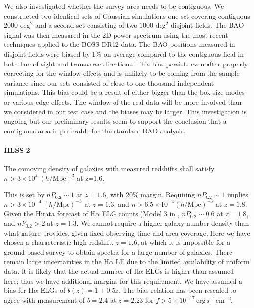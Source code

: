  We also investigated whether the survey area needs to be contiguous. We
 constructed two identical sets of Gaussian simulations one set covering
 contiguous 2000 deg$^2$ and a second set consisting of two $1000$ deg$^2$
 disjoint fields. The BAO signal was then measured in the 2D power spectrum using the
 most recent techniques applied to the BOSS DR12 data. The BAO positions measured
 in disjoint fields were biased by 1\% on average compared to the contiguous
 field in both line-of-sight and transverse directions. This bias persists even
 after properly correcting for the window effects and is unlikely to be coming
 from the sample variance since our sets consisted of close to one thousand
 independent simulations. This bias could be a result of either bigger than the
 box-size modes or various edge effects. The window of the real data will be more
 involved than we considered in our test case and the biases may be larger. This
 investigation is ongoing but our preliminary results seem to support the
 conclusion that a contiguous area is preferable for the standard BAO analysis.

\paragraph{HLSS 2} The comoving density of galaxies with measured redshifts shall satisfy $n > 3\times10^{4}\ (h/\textrm{Mpc})^3$ at z=1.6.

 This is set by $nP_{0.2} \sim1$ at $z=1.6$, with 20\% margin. Requiring $nP_{0.2}
 \sim1$ implies $n> 3\times10^{-4}\ (h/\mathrm{Mpc})^{-3}$ at $z=1.3$, and $n >
 6.5\times 10^{-4} (h/\mathrm{Mpc})^{-3}$ at $z=1.8$. Given the Hirata
 forecast of H$\alpha$ ELG counts (Model 3 in \citet{Pozzetti:2016}, $nP_{0.2}\sim0.6$ at $z=1.8$,
 and $nP_{0.2}>2$ at $z=1.3$.  We cannot require a higher galaxy number density than
 what nature provides, given fixed observing time and area coverage. Here we have
 chosen a characteristic high redshift, $z=1.6$, at which it is impossible for a
 ground-based survey to obtain spectra for a large number of galaxies. There
 remain large uncertainties in the H$\alpha$ LF due to the limited availability of
 uniform data. It is likely that the actual number of H$\alpha$ ELGs is higher than
 assumed here; thus we have additional margins for this requirement. We have
 assumed a bias for H$\alpha$ ELGs of $b(z) = 1+0.5z$. The bias relation has been rescaled
 to agree with \citet{Geach2012} measurement of $b=2.4$ at $z=2.23$ for $f >
 5\times 10^{-17} \, \mathrm{ erg\,s^{-1}cm^{-2}}$.

